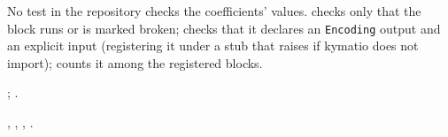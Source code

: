 No test in the repository checks the coefficients' values. 
checks only that the block runs or is marked broken; 
checks that it declares an \texttt{Encoding} output and an explicit input (registering it under
a stub that raises if kymatio does not import);  counts it among
the registered blocks.

\citet{anden2014deep}; \citet{andreux2020kymatio}.

, ,
, .
